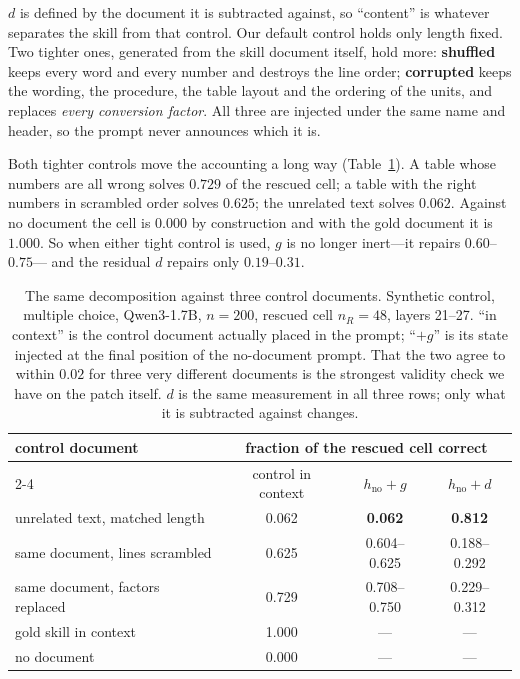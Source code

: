 \documentclass{article}
\newcommand{\dvec}{\ensuremath{d}}
\newcommand{\gvec}{\ensuremath{g}}
\begin{document}
$\dvec$ is defined by the document it is subtracted against, so ``content'' is
whatever separates the skill from that control. Our default control holds only
length fixed. Two tighter ones, generated from the skill document itself, hold
more: \textbf{shuffled} keeps every word and every number and destroys the line
order; \textbf{corrupted} keeps the wording, the procedure, the table layout and
the ordering of the units, and replaces \emph{every conversion factor}. All
three are injected under the same name and header, so the prompt never announces
which it is.

Both tighter controls move the accounting a long way
(Table~\ref{tab:controls}). A table whose numbers are all wrong solves $0.729$
of the rescued cell; a table with the right numbers in scrambled order solves
$0.625$; the unrelated text solves $0.062$. Against no document the cell is
$0.000$ by construction and with the gold document it is $1.000$. So when either
tight control is used, $\gvec$ is no longer inert---it repairs $0.60$--$0.75$---
and the residual $\dvec$ repairs only $0.19$--$0.31$.

\begin{table}[t]
\caption{The same decomposition against three control documents. Synthetic
control, multiple choice, Qwen3-1.7B, $n=200$, rescued cell $n_R=48$, layers
21--27. ``in context'' is the control document actually placed in the prompt;
``$+\gvec$'' is its state injected at the final position of the no-document
prompt. That the two agree to within $0.02$ for three very different documents
is the strongest validity check we have on the patch itself. $\dvec$ is the
same measurement in all three rows; only what it is subtracted against changes.}
\label{tab:controls}
\centering
\small
\begin{tabular}{lccc}
\toprule
control document & \multicolumn{3}{c}{fraction of the rescued cell correct}\\
\cmidrule(lr){2-4}
 & control in context & $h_{\text{no}}+\gvec$ & $h_{\text{no}}+\dvec$ \\
\midrule
unrelated text, matched length      & 0.062 & \textbf{0.062} & \textbf{0.812} \\
same document, lines scrambled      & 0.625 & 0.604--0.625   & 0.188--0.292 \\
same document, factors replaced     & 0.729 & 0.708--0.750   & 0.229--0.312 \\
\midrule
gold skill in context & 1.000 & --- & --- \\
no document           & 0.000 & --- & --- \\
\bottomrule
\end{tabular}
\end{table}
\end{document}
